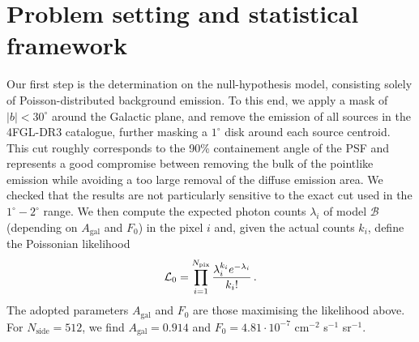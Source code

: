 \documentclass{article}
\begin{document}
\section{Problem setting and statistical framework}
\label{sec:procedure}
Our first step is the determination on the null-hypothesis model, consisting solely 
of Poisson-distributed background emission.
%
To this end, we apply a mask of  $|b|<30^\circ$ around the Galactic plane, and remove the emission of all 
sources in the 4FGL-DR3 catalogue, further masking a $1^\circ$ disk around each source centroid. This cut roughly corresponds to the 90\% containement angle of the PSF and represents a good compromise between removing the bulk of the pointlike emission while avoiding a too large removal of the diffuse emission area. We checked that the results are not particularly sensitive to the exact cut used in the $1^\circ-2^\circ$ range. 
%
We then compute the expected photon counts $\lambda_i$ of model $\mathcal{B}$ (depending on $A_\textrm{gal}$  and $ F_{0}$) in the pixel $i$  and, given the actual counts $k_i$, define the Poissonian likelihood  
\begin{equation}
{\cal L}_0=\prod_{i=1}^{N_\textrm{pix}} \frac{\lambda_i^{k_i}e^{-{\lambda_i}}}{k_i!}\, .
\end{equation}
The adopted parameters $A_\textrm{gal}$  and $ F_{0}$ are those maximising the likelihood above. For $N_\textrm{side}=512$, we find $A_\textrm{gal}=0.914$ and $F_0=4.81\cdot 10^{-7}$ cm$^{-2}$ s$^{-1}$ sr$^{-1}$.
%
\end{document}
